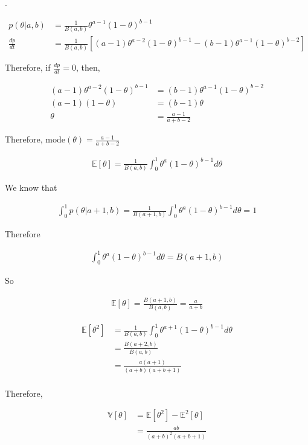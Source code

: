 \documentclass[UTF8]{article}
\begin{document}
.

\begin{align*}
    p(\theta|a, b) &= \frac{1}{B(a, b)}\theta^{a-1}(1-\theta)^{b-1}\\
    \frac{dp}{dt}&= \frac{1}{B(a, b)}[(a-1)\theta^{a-2}(1-\theta)^{b-1}-(b-1)\theta^{a-1}(1-\theta)^{b-2}]
\end{align*}

Therefore, if $\frac{dp}{dt} = 0$, then, 

\begin{align*}
    (a-1)\theta^{a-2}(1-\theta)^{b-1}&=(b-1)\theta^{a-1}(1-\theta)^{b-2}\\
    (a-1)(1-\theta) &= (b-1)\theta\\
    \theta &= \frac{a-1}{a+b-2}
\end{align*}

Therefore, $\text{mode}(\theta) = \frac{a-1}{a+b-2}$

\begin{align*}
    \mathbb{E}[\theta] = \frac{1}{B(a, b)}\int_{0}^{1}\theta^{a}(1-\theta)^{b-1}d\theta
\end{align*}

We know that

\begin{align*}
    \int_{0}^{1}p(\theta|a+1, b) = \frac{1}{B(a+1, b)}\int_{0}^{1}\theta^{a}(1-\theta)^{b-1}d\theta = 1
\end{align*}

Therefore

\begin{align*}
    \int_{0}^{1}\theta^{a}(1-\theta)^{b-1}d\theta = B(a+1, b)
\end{align*}

So

\begin{align*}
    \mathbb{E}[\theta] = \frac{B(a+1, b)}{B(a, b)} = \frac{a}{a+b}
\end{align*}

\begin{align*}
    \mathbb{E}[\theta^2] &= \frac{1}{B(a, b)}\int_{0}^{1}\theta^{a+1}(1-\theta)^{b-1}d\theta\\
    &=\frac{B(a+2, b)}{B(a, b)}\\
    &=\frac{a(a+1)}{(a+b)(a+b+1)}\\
\end{align*}

Therefore,

\begin{align*}
    \mathbb{V}[\theta] &= \mathbb{E}[\theta^2] - \mathbb{E}^2[\theta]\\
    &=\frac{ab}{(a+b)^2(a+b+1)}\\
\end{align*}
\end{document}
